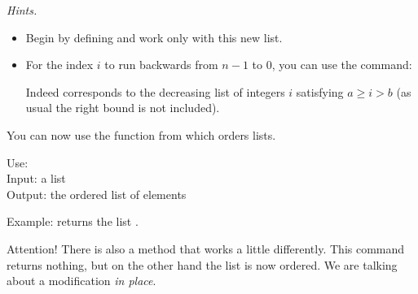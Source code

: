 \documentclass[11pt,class=report,crop=false]{standalone}
\begin{document}
\begin{activite}
\medskip

\emph{Hints.}
\begin{itemize}
  \item Begin by defining  and work only with this new list.
  \item For the index $i$ to run backwards from $n-1$ to $0$, you can use the command: 

Indeed  corresponds to the decreasing list of integers $i$ satisfying $a \ge i > b$ (as usual the right bound is not included).
\end{itemize}

\end{activite}


\begin{cours}[Sorting]

You can now use the  function from \Python{} which orders lists.

 
  \begin{fonctionpython}
    Use: \\
    Input: a list \\
    Output: the ordered list of elements
  
  \medskip
     
   Example:  returns the list \ci{[4,6,6,7,8,11,12,13]}.

  \end{fonctionpython}  
  
  Attention! There is also a  method that works a little differently. This command returns nothing, but on the other hand the list  is now ordered. We are talking about a modification \emph{in place}.
\end{cours}


\end{document}
